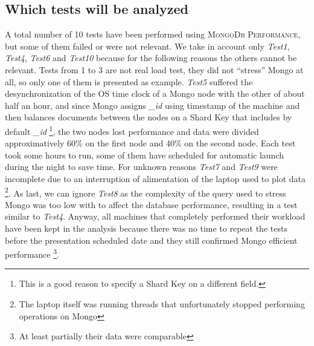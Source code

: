 \subsection{Which tests will be analyzed}
A total number of 10 tests have been performed using \textsc{MongoDb Performance}, but some of them failed or were not relevant.
We take in account only \textit{Test1}, \textit{Test4}, \textit{Test6} and \textit{Test10} because for the following reasons the others cannot be relevant.
Tests from 1 to 3 are not real load test, they did not “stress” Mongo at all, so only one of them is presented as example.
\textit{Test5} suffered the desynchronization of the OS time clock of a Mongo node with the other of about half an hour, and since Mongo assigns \textit{\_id} using timestamp of the machine and then balances documents between the nodes on a Shard Key that includes by default \textit{\_id} \footnote{This is a good reason to specify a Shard Key on a different field.}, the two nodes lost performance and data were divided approximatively 60\% on the first node and 40\% on the second node. 
Each test  took some hours to run, some of them have scheduled for automatic launch during the night to save time.
For unknown reasons \textit{Test7} and  \textit{Test9} were incomplete due to an interruption of alimentation of the laptop used to plot data \footnote{The laptop itself was running threads that unfortunately stopped performing operations on Mongo}.
As last, we can ignore \textit{Test8} as the complexity of the query used to stress Mongo was too low with to affect the database performance, resulting in a test similar to \textit{Test4}.
Anyway, all machines that completely performed their workload have been kept in the analysis because there was no time to repeat the tests before the presentation scheduled date and they still confirmed Mongo efficient performance \footnote{At least partially their data were comparable}.

